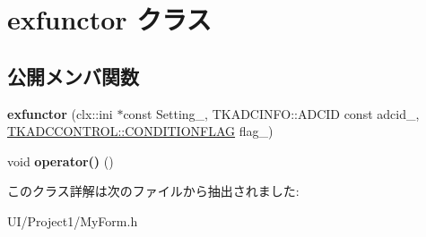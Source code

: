 \hypertarget{classexfunctor}{}\section{exfunctor クラス}
\label{classexfunctor}
\subsection*{公開メンバ関数}
\begin{DoxyCompactItemize}
\item 
\mbox{\label{classexfunctor_a046e03c5618e10bc3a3145af0fe97c6d}} 
{\bfseries exfunctor} (clx\+::ini $\ast$const Setting\+\_\+, T\+K\+A\+D\+C\+I\+N\+F\+O\+::\+A\+D\+C\+ID const adcid\+\_\+, \hyperlink{class_t_k_a_d_c_c_o_n_t_r_o_l_a4ec8bb3e68a489f7a757d08a855ffb61}{T\+K\+A\+D\+C\+C\+O\+N\+T\+R\+O\+L\+::\+C\+O\+N\+D\+I\+T\+I\+O\+N\+F\+L\+AG} flag\+\_\+)
\item 
\mbox{\label{classexfunctor_add31fc15807f9bc3efe7761173213c44}} 
void {\bfseries operator()} ()
\end{DoxyCompactItemize}


このクラス詳解は次のファイルから抽出されました\+:\begin{DoxyCompactItemize}
\item 
U\+I/\+Project1/My\+Form.\+h\end{DoxyCompactItemize}
